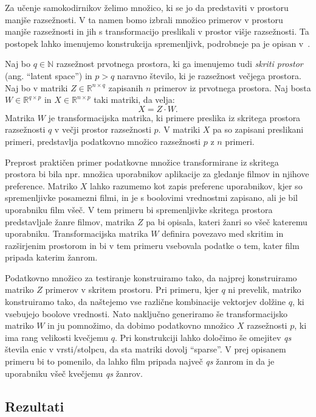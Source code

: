 \documentclass[12pt,a4paper,twoside]{article}
\theoremstyle{definition} %
\theoremstyle{plain} %
\numberwithin{equation}{section}  %
\newcommand{\R}{\mathbb R}
\newcommand{\N}{\mathbb N}
\begin{document}
Za učenje samokodirnikov želimo množico, ki se jo da predstaviti v prostoru manjše razsežnosti.
V ta namen bomo izbrali množico primerov v prostoru manjše razsežnosti in jih s transformacijo preslikali v prostor višje razsežnosti.
Ta postopek lahko imenujemo konstrukcija spremenljivk, podrobneje pa je opisan v~\cite[razdelek\ 10.3]{flach2012machine}.

Naj bo $q \in \N$ razsežnost prvotnega prostora, ki ga imenujemo tudi \emph{skriti prostor} (ang. ``latent space'')
in $p > q$ naravno število, ki je razsežnost večjega prostora.
Naj bo v matriki $Z \in \R^{n \times q}$ zapisanih $n$ primerov iz prvotnega prostora.
Naj bosta $W \in \R^{q \times p}$ in $X \in \R^{n \times p}$ taki matriki, da velja:
\[
	X = Z \cdot W.
\]
Matrika $W$ je transformacijska matrika, ki primere preslika iz skritega prostora razsežnosti $q$ v večji prostor razsežnosti $p$.
V matriki $X$ pa so zapisani preslikani primeri, predstavlja podatkovno množico razsežnosti $p$ z $n$ primeri.

Preprost praktičen primer podatkovne množice transformirane iz skritega prostora bi bila npr. množica uporabnikov aplikacije za gledanje filmov in njihove preference.
Matriko $X$ lahko razumemo kot zapis preferenc uporabnikov, kjer so spremenljivke posamezni filmi, in je s boolovimi vrednostmi zapisano, ali je bil uporabniku film všeč.
V tem primeru bi spremenljivke skritega prostora predstavljale žanre filmov, matrika $Z$ pa bi opisala, kateri žanri so všeč kateremu uporabniku.
Transformacijska matrika $W$ definira povezavo med skritim in razširjenim prostorom in bi v tem primeru vsebovala podatke o tem, kater film pripada katerim žanrom.

Podatkovno množico za testiranje konstruiramo tako, da najprej konstruiramo matriko $Z$ primerov v skritem prostoru.
Pri primeru, kjer $q$ ni prevelik, matriko konstruiramo tako, da naštejemo vse različne kombinacije vektorjev dolžine $q$, ki vsebujejo boolove vrednosti.
Nato naključno generiramo še transformacijsko matriko $W$ in ju pomnožimo, da dobimo podatkovno množico $X$ razsežnosti $p$, ki ima rang velikosti kvečjemu $q$.
Pri konstrukciji lahko določimo še omejitev \textit{qs} števila enic v vrsti/stolpcu, da sta matriki dovolj ``sparse''.
V prej opisanem primeru bi to pomenilo, da lahko film pripada največ \textit{qs} žanrom in da je uporabniku všeč kvečjemu \textit{qs} žanrov.

\subsection{Rezultati}
\end{document}
